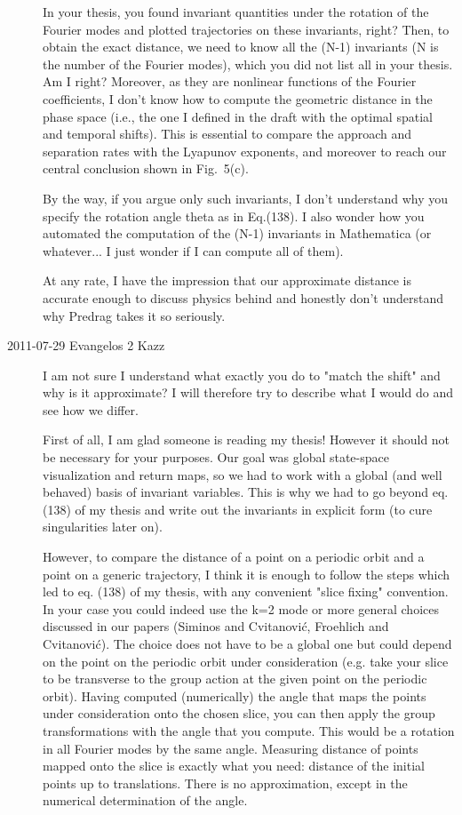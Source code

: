 \begin{description}
In your thesis, you found invariant quantities under the  rotation
of the Fourier modes and plotted trajectories on these invariants, right?
Then, to obtain the exact distance, we need to know all the (N-1)
invariants (N is the number of the Fourier modes), which you did not list
all in your thesis. Am I right? Moreover, as they are nonlinear functions
of the Fourier coefficients, I don't know how to compute the geometric
distance in the phase space (i.e., the one I defined in the draft with
the optimal spatial and temporal shifts). This is essential to compare
the approach and separation rates with the Lyapunov exponents, and
moreover to reach our central conclusion shown in Fig.~5(c).

By the way, if you argue only such invariants, I don't understand why you
specify the rotation angle theta as in Eq.(138). I also wonder how you
automated the computation of the (N-1) invariants in Mathematica (or
whatever... I just wonder if I can compute all of them).

At any rate, I have the impression that our approximate distance is
accurate enough to discuss physics behind and honestly don't understand
why Predrag takes it so seriously.

\item[2011-07-29 Evangelos 2 Kazz]
I am not sure I understand what exactly you do to "match the shift"
and why is it approximate? I will therefore try to describe what I
would do and see how we differ.

First of all, I am glad someone is reading my thesis! However it
should not be necessary for your purposes. Our goal was global
state-space visualization and return maps, so we had to work with a
global (and well behaved) basis of invariant variables. This is why we
had to go beyond eq. (138) of my thesis and write out the invariants
in explicit form (to cure singularities later on).

However, to compare the distance of a point on a periodic orbit and a
point on a generic trajectory, I think it is enough to follow the steps
which led to eq. (138) of my thesis, with any convenient "slice fixing"
convention. In your case you could indeed use the k=2 mode or more
general choices discussed in our papers (Siminos and
Cvitanovi\'c, Froehlich and Cvitanovi\'c). The
choice does not have to be a global one but could depend on the point
on the periodic orbit under consideration (e.g. take your slice to be
transverse to the group action at the given point on the periodic
orbit). Having computed (numerically) the angle that maps the points
under consideration onto the chosen slice, you can then apply the
group transformations with the angle that you compute. This would be a
rotation in all Fourier modes by the same angle. Measuring distance of
points mapped onto the slice is exactly what you need: distance of the
initial points up to translations. There is no approximation, except
in the numerical determination of the angle.


\end{description}
